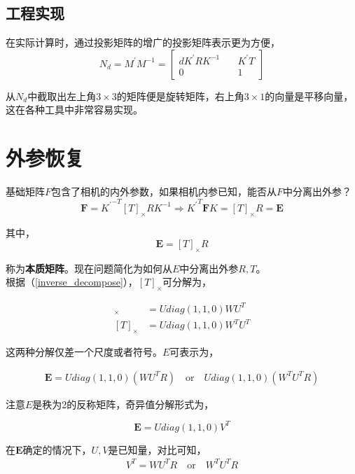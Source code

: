 	\subsection*{工程实现}
		在实际计算时，通过投影矩阵的增广的投影矩阵表示更为方便，
		\begin{equation}
			N_d= M^{\prime}M^{-1} = \begin{bmatrix}
				dK^\prime R K^{-1} \quad& K^\prime T\\
				0\quad& 1\quad
			\end{bmatrix}\label{extend_f}		
		\end{equation}

		从$N_d$中截取出左上角$3\times 3$的矩阵便是旋转矩阵，右上角$3\times 1$的向量是平移向量，这在各种工具中非常容易实现。

\section{外参恢复}\label{section_recovery_outer_p}
	基础矩阵$F$包含了相机的内外参数，如果相机内参已知，能否从$F$中分离出外参？\\

	$$
		\mathbf{F} = {K^{\prime}}^{-T}[T]_{\times}RK^{-1} \Rightarrow {K^{\prime}}^{T}\mathbf{F} K = [T]_{\times}R = \mathbf{E}
	$$

	其中，
	$$
		\mathbf{E} = [T]_{\times}R
	$$

	称为\textbf{本质矩阵}。现在问题简化为如何从$E$中分离出外参$R,T$。\\

	根据（\ref{inverse_decompose}），$[T]_{\times}$可分解为，

	\begin{align*}
		[T]_{\times} &= U diag(1,1,0)WU^T\\
		[T]_{\times} &= U diag(1,1,0)W^TU^T
	\end{align*}

	这两种分解仅差一个尺度或者符号。$E$可表示为，

	\begin{align*}
		\mathbf{E} = U diag(1,1,0)\left(WU^TR\right)\quad 
		\text{or} \quad 
		U diag(1,1,0)\left(W^TU^TR\right)
	\end{align*}

	注意$E$是秩为2的反称矩阵，奇异值分解形式为，

	$$
		\mathbf{E} = U diag(1,1,0) V^T
	$$

	在$\mathbf{E} $确定的情况下，$U,V$是已知量，对比可知，
	\begin{align*}
		V^T = WU^TR \quad \text{or}\quad W^TU^TR
	\end{align*}

